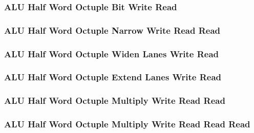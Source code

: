 \subsubsection[{\small ALU Half Word Octuple Bit Write Read}]{ALU Half Word Octuple Bit Write Read} \label{sec:format-ALU-HOBWR}



\subsubsection[{\small ALU Half Word Octuple Narrow Write Read Read}]{ALU Half Word Octuple Narrow Write Read Read} \label{sec:format-ALU-HONWRR}



\subsubsection[{\small ALU Half Word Octuple Widen Lanes Write Read}]{ALU Half Word Octuple Widen Lanes Write Read} \label{sec:format-ALU-HOWIDEWR}



\subsubsection[{\small ALU Half Word Octuple Extend Lanes Write Read}]{ALU Half Word Octuple Extend Lanes Write Read} \label{sec:format-ALU-HOEXTLWR}



\subsubsection[{\small ALU Half Word Octuple Multiply Write Read Read}]{ALU Half Word Octuple Multiply Write Read Read} \label{sec:format-ALU-HOMWRR}



\subsubsection[{\small ALU Half Word Octuple Multiply Write Read Read Read}]{ALU Half Word Octuple Multiply Write Read Read Read} \label{sec:format-ALU-HOMWRRR}

